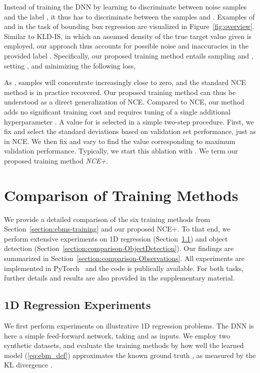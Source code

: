 \documentclass{bmvc2k}
\begin{document}
Instead of training the DNN  by learning to discriminate between noise samples  and the label , it thus has to discriminate between the samples  and . Examples of  and  in the task of bounding box regression are visualized in Figure~\ref{fig:overview}. Similar to KLD-IS, in which an assumed density of the true target value  given  is employed, our approach thus accounts for possible noise and inaccuracies in the provided label . Specifically, our proposed training method entails sampling  and , setting , and minimizing the following loss,

As , samples  will concentrate increasingly close to zero, and the standard NCE method is in practice recovered. Our proposed training method can thus be understood as a direct generalization of NCE. Compared to NCE, our method adds no significant training cost and requires tuning of a single additional hyperparameter . A value for  is selected in a simple two-step procedure. First, we fix  and select the standard deviations  based on validation set performance, just as in NCE. We then fix  and vary  to find the value corresponding to maximum validation performance. Typically, we start this ablation with . We term our proposed training method \textit{NCE+}. \section{Comparison of Training Methods}
\label{section:comparison}
We provide a detailed comparison of the six training methods from Section~\ref{section:ebms-training} and our proposed NCE+. To that end, we perform extensive experiments on 1D regression (Section~\ref{section:comparison-1DRegression}) and object detection (Section~\ref{section:comparison-ObjectDetection}). Our findings are summarized in Section~\ref{section:comparison-Observations}. All experiments are implemented in PyTorch~\cite{paszke2019pytorch} and the code is publically available. For both tasks, further details and results are also provided in the supplementary material.




















\subsection{1D Regression Experiments}
\label{section:comparison-1DRegression}
We first perform experiments on illustrative 1D regression problems. The DNN  is here a simple feed-forward network, taking  and  as inputs. We employ two synthetic datasets, and evaluate the training methods by how well the learned model  (\ref{eq:ebm_def}) approximates the known ground truth , as measured by the KL divergence .
\end{document}
